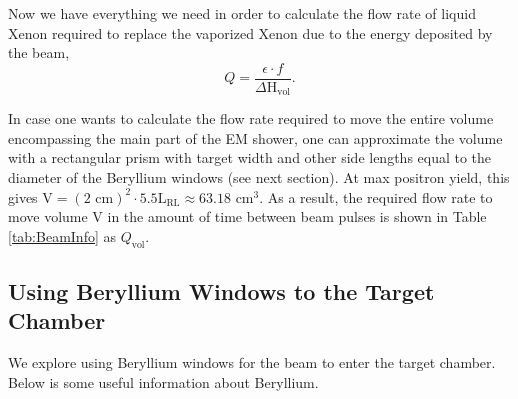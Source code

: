 \documentclass[%
reprint,
amsmath, amssymb,
aps,
floatfix,
]{revtex4-2}
\begin{document}
Now we have everything we need in order to calculate the flow rate of liquid Xenon
required to replace the vaporized Xenon due to the energy deposited by the beam,
\begin{equation}
    Q = \frac{\epsilon \cdot f}{\Delta \textrm{H}_{\textrm{vol}}}.
\label{eq:Q}
\end{equation}

In case one wants to calculate the flow rate required to move the entire volume encompassing the main
part of the EM shower, one can approximate the volume with a rectangular prism with target width and other
side lengths equal to the diameter of the Beryllium windows (see next section).  At max positron yield,
this gives $\textrm{V} = (2 \textrm{ cm})^2 \cdot 5.5\textrm{L}_{\textrm{RL}} \approx 63.18 \textrm{ cm}^3$.
As a result, the required flow rate to move volume V in the amount of time between beam pulses is
shown in Table \ref{tab:BeamInfo} as $Q_\textrm{vol}$.

\subsection{Using Beryllium Windows to the Target Chamber}
We explore using Beryllium windows for the beam to enter the target chamber.
Below is some useful information about Beryllium.
\end{document}
